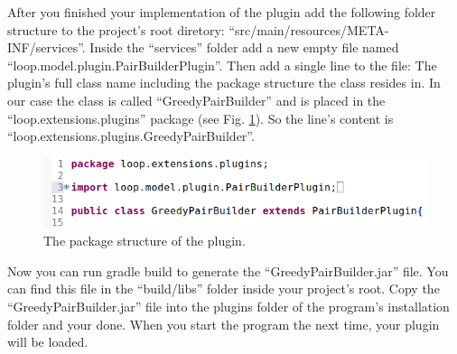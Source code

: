 \documentclass[parskip=full,11pt]{scrartcl}
\begin{document}
After you finished your implementation of the plugin add the following folder structure to the project's root diretory: \enquote{src/main/resources/META-INF/services}. Inside the \enquote{services} folder add a new empty file named \enquote{loop.model.plugin.PairBuilderPlugin}. Then add a single line to the file: The plugin's full class name including the package structure the class resides in. In our case the class is called \enquote{GreedyPairBuilder} and is placed in the \enquote{loop.extensions.plugins} package (see Fig. \ref{fig:package}). So the line's content is \enquote{loop.extensions.plugins.GreedyPairBuilder}.

\begin{figure} [hbt]
	\centering
	\includegraphics[width=0.9\linewidth]{img_manual/package-structure.png}
	\caption{The package structure of the plugin.}
	\label{fig:package}
\end{figure}

Now you can run gradle build to generate the \enquote{GreedyPairBuilder.jar} file. You can find this file in the \enquote{build/libs} folder inside your project's root. Copy the \enquote{GreedyPairBuilder.jar} file into the plugins folder of the program's installation folder and your done. When you start the program the next time, your plugin will be loaded.
\end{document}
